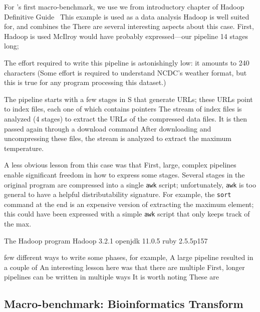 \documentclass[sigplan,10pt,review,anonymous]{acmart}
\newcommand{\ttt}[1]{\texttt{\small #1}}
\newcommand{\cn}[1]{\mbox{\textcircled{\footnotesize #1}}}
\newcommand{\sta}{\cn{\textsc{S}}\xspace}
\begin{document}
For \sys's first macro-benchmark, we use we
from introductory chapter of Hadoop Definitive Guide~\cite[Chapter 2]{hadoop:15}
This example is used as a data analysis Hadoop is well suited for, and combines the 
There are several interesting aspects about this case.
First, Hadoop is used 
McIlroy would have probably expressed---our pipeline 
14 stages long;

The effort required to write this pipeline is astonishingly low:
  it amounts to 240 characters 
(Some effort is required to understand NCDC's weather format, but this is true for any program processing this dataset.)

The pipeline starts with a few stages in \sta  that generate URLs;
  these URLs point to index files, each one of which contains pointers 
The stream of index files is analyzed (4 stages) to extract the URLs of the compressed data files.
It is then passed again through a download command
After downloading and uncompressing these files, the stream is analyzed to extract the maximum temperature.

A less obvious lesson from this case was that  
First, large, complex pipelines enable significant freedom in how to express some stages.
Several stages in the original program are compressed into a single \ttt{awk} script;
  unfortunately, \ttt{awk} is too general to have a helpful distributability signature.
For example, the \ttt{sort} command at the end is an expensive version of extracting the maximum element;
  this could have been expressed with a simple \ttt{awk} script that only keeps track of the max.

The Hadoop program 
Hadoop 3.2.1
openjdk 11.0.5
ruby 2.5.5p157

few different ways to write some phases, 
  for example, 
A large pipeline resulted in a couple of 
An interesting lesson here was that there are multiple
First, longer pipelines can be written in multiple ways
It is worth noting
These are 


\subsection{Macro-benchmark: Bioinformatics Transform}
\label{macro3}
\end{document}
